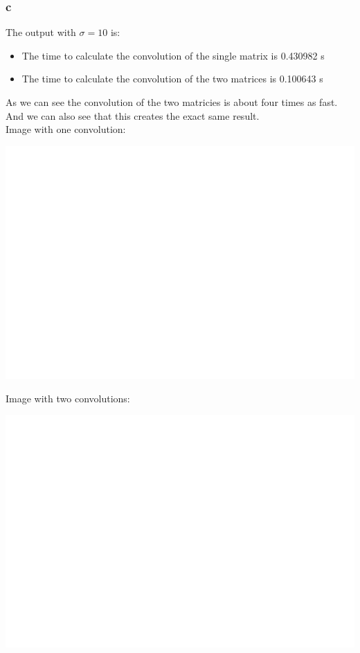 \documentclass[11pt]{article}
\begin{document}
\subsubsection{c}
\label{sec:org461602f}
The output with \(\sigma=10\) is:
\begin{itemize}
\item The time to calculate the convolution of the single matrix is 0.430982 s
\item The time to calculate the convolution of the two matrices is 0.100643 s
\end{itemize}
As we can see the convolution of the two matricies is about four times as fast. And we can also see that this creates the exact same result.\\
Image with one convolution:
\begin{center}
\includegraphics[width=.9\linewidth]{ENG204-Assignment-3-Single-sigma-10.png}
\end{center}
Image with two convolutions:
\begin{center}
\includegraphics[width=.9\linewidth]{ENG204-Assignment-3-Double-sigma-10.png}
\end{center}
\end{document}
